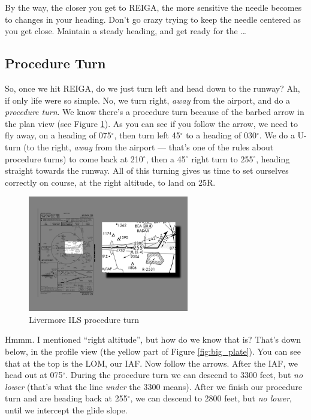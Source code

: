 By the way, the closer you get to REIGA, the more sensitive the needle
becomes to changes in your heading.  Don't go crazy trying to keep the
needle centered as you get close.  Maintain a steady heading, and get
ready for the \ldots{}

\subsection{Procedure Turn}

So, once we hit REIGA, do we just turn left and head down to the
runway?  Ah, if only life were so simple.  No, we turn right,
\emph{away} from the airport, and do a \emph{procedure turn}.  We know
there's a procedure turn because of the barbed arrow in the plan view
(see Figure \ref{fig:PT}).  As you can see if you follow the arrow, we
need to fly away, on a heading of 075$^\circ$, then turn left
45$^\circ$ to a heading of 030$^\circ$.  We do a U-turn (to the right,
\emph{away} from the airport --- that's one of the rules about
procedure turns) to come back at 210$^\circ$, then a 45$^\circ$ right
turn to 255$^\circ$, heading straight towards the runway.  All of this
turning gives us time to set ourselves correctly on course, at the
right altitude, to land on 25R.

\begin{figure}
  \begin{center}
    \includegraphics[width=7cm]{img/PT}
    \caption{Livermore ILS procedure turn}
    \label{fig:PT}
  \end{center}
\end{figure}

Hmmm.  I mentioned ``right altitude'', but how do we know that is?
That's down below, in the profile view (the yellow part of Figure
\ref{fig:big_plate}).  You can see that at the top is the LOM, our
IAF.  Now follow the arrows.  After the IAF, we head out at
075$^\circ$.  During the procedure turn we can descend to 3300 feet,
but \emph{no lower} (that's what the line \emph{under} the 3300
means).  After we finish our procedure turn and are heading back at
255$^\circ$, we can descend to 2800 feet, but \emph{no lower}, until
we intercept the glide slope.

